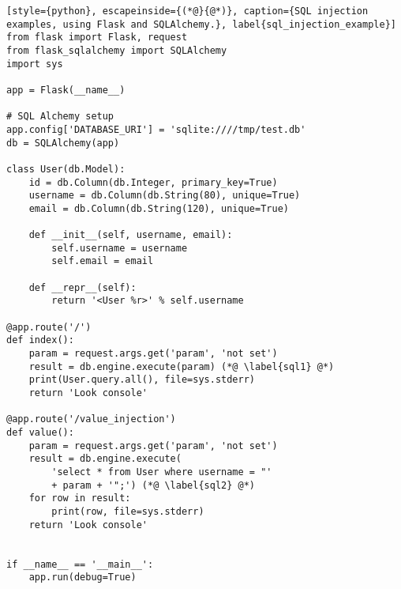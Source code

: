 \begin{lstlisting}[style={python}, escapeinside={(*@}{@*)}, caption={SQL injection examples, using Flask and SQLAlchemy.}, label{sql_injection_example}]
from flask import Flask, request
from flask_sqlalchemy import SQLAlchemy
import sys

app = Flask(__name__)

# SQL Alchemy setup
app.config['DATABASE_URI'] = 'sqlite:////tmp/test.db'
db = SQLAlchemy(app)

class User(db.Model):
    id = db.Column(db.Integer, primary_key=True)
    username = db.Column(db.String(80), unique=True)
    email = db.Column(db.String(120), unique=True)

    def __init__(self, username, email):
        self.username = username
        self.email = email

    def __repr__(self):
        return '<User %r>' % self.username    
    
@app.route('/')
def index():
    param = request.args.get('param', 'not set')
    result = db.engine.execute(param) (*@ \label{sql1} @*)
    print(User.query.all(), file=sys.stderr) 
    return 'Look console'

@app.route('/value_injection')
def value():
    param = request.args.get('param', 'not set')
    result = db.engine.execute(
        'select * from User where username = "'
        + param + '";') (*@ \label{sql2} @*)
    for row in result:
        print(row, file=sys.stderr)
    return 'Look console'


if __name__ == '__main__':
    app.run(debug=True)
\end{lstlisting}
